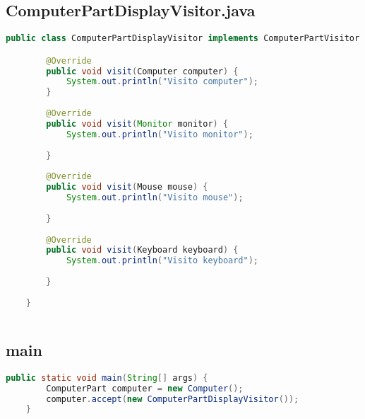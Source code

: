 \subsection{ComputerPartDisplayVisitor.java}
\begin{lstlisting}[language=java]
    public class ComputerPartDisplayVisitor implements ComputerPartVisitor {

        @Override
        public void visit(Computer computer) {
            System.out.println("Visito computer");
        }
    
        @Override
        public void visit(Monitor monitor) {
            System.out.println("Visito monitor");
            
        }
    
        @Override
        public void visit(Mouse mouse) {
            System.out.println("Visito mouse");
            
        }
    
        @Override
        public void visit(Keyboard keyboard) {
            System.out.println("Visito keyboard");
            
        }
        
    }
    
\end{lstlisting}

\subsection{main}
\begin{lstlisting}[language=java]
    public static void main(String[] args) {
        ComputerPart computer = new Computer();
        computer.accept(new ComputerPartDisplayVisitor());
    }
\end{lstlisting}